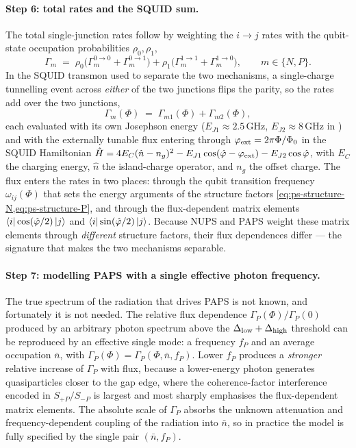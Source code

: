 \paragraph{Step 6: total rates and the SQUID sum.}
The total single-junction rates follow by weighting the $i\to j$
rates with the qubit-state occupation probabilities
$\rho_0,\rho_1$,
\begin{equation}
\label{eq:ps-total-single}
\Gamma_m \;=\; \rho_0\bigl(\Gamma_m^{0\to0}+\Gamma_m^{0\to1}\bigr)
+ \rho_1\bigl(\Gamma_m^{1\to1}+\Gamma_m^{1\to0}\bigr),
\qquad m\in\{N,P\}.
\end{equation}
In the SQUID transmon used to separate the two mechanisms, a
single-charge tunnelling event across \emph{either} of the two
junctions flips the parity, so the rates add over the two
junctions,
\begin{equation}
\label{eq:ps-squid-sum}
\Gamma_m(\Phi) \;=\; \Gamma_{m1}(\Phi) + \Gamma_{m2}(\Phi),
\end{equation}
each evaluated with its own Josephson energy
($E_{J1}\approx 2.5\,\text{GHz}$, $E_{J2}\approx 8\,\text{GHz}$ in
\cite{diamond2022}) and with the externally tunable flux entering
through $\varphi_{\rm ext}=2\pi\Phi/\Phi_0$ in the SQUID
Hamiltonian
$\hat{H} = 4E_C(\hat n - n_g)^2 - E_{J1}\cos(\hat\varphi-\varphi_{\rm ext})
- E_{J2}\cos\hat\varphi$, with $E_C$ the charging energy, $\hat n$
the island-charge operator, and $n_g$ the offset charge. The flux
enters the rates in two places: through the qubit transition
frequency $\omega_{ij}(\Phi)$ that sets the energy arguments of the
structure factors
\cref{eq:ps-structure-N,eq:ps-structure-P}, and through the
flux-dependent matrix elements
$\bra{i}\cos(\hat\varphi/2)\ket{j}$ and
$\bra{i}\sin(\hat\varphi/2)\ket{j}$. Because NUPS and PAPS weight
these matrix elements through \emph{different} structure factors,
their flux dependences differ --- the signature that makes the two
mechanisms separable.

\paragraph{Step 7: modelling PAPS with a single effective photon frequency.}
The true spectrum of the radiation that drives PAPS is not known,
and fortunately it is not needed. The relative flux dependence
$\Gamma_P(\Phi)/\Gamma_P(0)$ produced by an arbitrary photon
spectrum above the $\Delta_{\rm low}+\Delta_{\rm high}$ threshold
can be reproduced by an effective single mode: a frequency $f_P$
and an average occupation $\bar n$, with
$\Gamma_P(\Phi)=\Gamma_P(\Phi,\bar n,f_P)$. Lower $f_P$ produces a
\emph{stronger} relative increase of $\Gamma_P$ with flux, because
a lower-energy photon generates quasiparticles closer to the gap
edge, where the coherence-factor interference encoded in
$S_{+P}/S_{-P}$ is largest and most sharply emphasises the
flux-dependent matrix elements. The absolute scale of $\Gamma_P$
absorbs the unknown attenuation and frequency-dependent coupling of
the radiation into $\bar n$, so in practice the model is fully
specified by the single pair $(\bar n,f_P)$.

